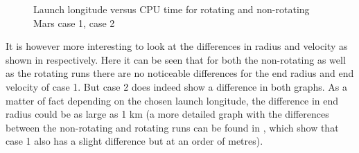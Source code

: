 \begin{figure}[H]
\centering
{} 
\caption{Launch longitude versus CPU time for rotating and non-rotating Mars \protect{} case 1,  \protect{} case 2 } 
\label{fig:launchLongitudeVsCPUcase1combined} 
\end{figure} 

\noindent
It is however more interesting to look at the differences in radius and velocity as shown in  respectively. Here it can be seen that for both the non-rotating as well as the rotating runs there are no noticeable differences for the end radius and end velocity of case 1. But case 2 does indeed show a difference in both graphs. As a matter of fact depending on the chosen launch longitude, the difference in end radius could be as large as 1 km (a more detailed graph with the differences between the non-rotating and rotating runs can be found in , which show that case 1 also has a slight difference but at an order of metres). 


